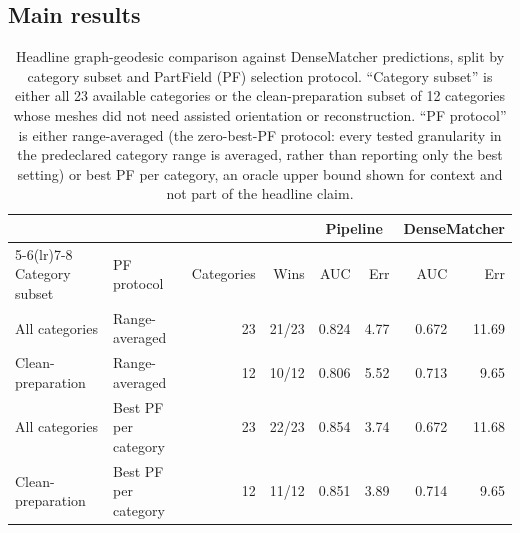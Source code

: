 \documentclass{article}
\begin{document}
\subsection{Main results}

\begin{table}[H]
\centering
\footnotesize
\setlength{\tabcolsep}{4pt}
\begin{tabularx}{\textwidth}{Xlrrrrrr}
\toprule
 & & & & \multicolumn{2}{c}{Pipeline} & \multicolumn{2}{c}{DenseMatcher} \\
\cmidrule(lr){5-6}\cmidrule(lr){7-8}
Category subset & PF protocol & Categories & Wins & AUC & Err & AUC & Err \\
\midrule
All categories & Range-averaged & 23 & 21/23 & 0.824 & 4.77 & 0.672 & 11.69 \\
Clean-preparation & Range-averaged & 12 & 10/12 & 0.806 & 5.52 & 0.713 & 9.65 \\
All categories & Best PF per category & 23 & 22/23 & 0.854 & 3.74 & 0.672 & 11.68 \\
Clean-preparation & Best PF per category & 12 & 11/12 & 0.851 & 3.89 & 0.714 & 9.65 \\
\bottomrule
\end{tabularx}
\caption{Headline graph-geodesic comparison against DenseMatcher predictions, split by category
subset and PartField (PF) selection protocol. ``Category subset'' is either all 23 available
categories or the clean-preparation subset of 12 categories whose meshes did not need assisted
orientation or reconstruction. ``PF protocol'' is either range-averaged (the zero-best-PF protocol:
every tested granularity in the predeclared category range is averaged, rather than reporting only
the best setting) or best PF per category, an oracle upper bound shown for context and not part of
the headline claim.}
\label{tab:densematcher-headline}
\end{table}
\end{document}
